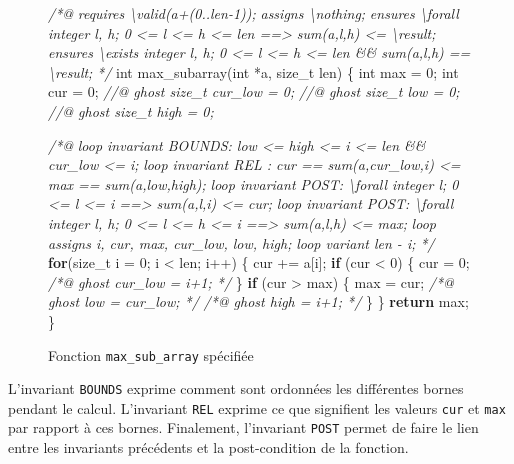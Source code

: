 \documentclass[12pt,francais,]{scrbook}
\newenvironment{Shaded}{}{}
\newcommand{\KeywordTok}[1]{\textcolor[rgb]{0.00,0.44,0.13}{\textbf{{#1}}}}
\newcommand{\DataTypeTok}[1]{\textcolor[rgb]{0.56,0.13,0.00}{{#1}}}
\newcommand{\DecValTok}[1]{\textcolor[rgb]{0.25,0.63,0.44}{{#1}}}
\newcommand{\CommentTok}[1]{\textcolor[rgb]{0.38,0.63,0.69}{\textit{{#1}}}}
\newcommand{\NormalTok}[1]{{#1}}
\begin{document}
\begin{figure}
\begin{footnotesize}\begin{Shaded}
\begin{Highlighting}[]
\CommentTok{/*@ }
\CommentTok{  requires \textbackslash{}valid(a+(0..len-1));}
\CommentTok{  assigns \textbackslash{}nothing;}
\CommentTok{  ensures \textbackslash{}forall integer l, h;  0 <= l <= h <= len ==> sum(a,l,h) <= \textbackslash{}result;}
\CommentTok{  ensures \textbackslash{}exists integer l, h;  0 <= l <= h <= len &&  sum(a,l,h) == \textbackslash{}result;}
\CommentTok{*/}
\DataTypeTok{int} \NormalTok{max_subarray(}\DataTypeTok{int} \NormalTok{*a, size_t len) \{}
  \DataTypeTok{int} \NormalTok{max = }\DecValTok{0}\NormalTok{;}
  \DataTypeTok{int} \NormalTok{cur = }\DecValTok{0}\NormalTok{;}
  \CommentTok{//@ ghost size_t cur_low = 0; }
  \CommentTok{//@ ghost size_t low = 0;}
  \CommentTok{//@ ghost size_t high = 0; }

  \CommentTok{/*@ }
\CommentTok{    loop invariant BOUNDS: low <= high <= i <= len && cur_low <= i;}
\CommentTok{    }
\CommentTok{    loop invariant REL :   cur == sum(a,cur_low,i) <= max == sum(a,low,high);}
\CommentTok{    loop invariant POST:   \textbackslash{}forall integer l;    0 <= l <= i      ==> sum(a,l,i) <= cur;}
\CommentTok{    loop invariant POST:   \textbackslash{}forall integer l, h; 0 <= l <= h <= i ==> sum(a,l,h) <= max;}
\CommentTok{   }
\CommentTok{    loop assigns i, cur, max, cur_low, low, high;}
\CommentTok{    loop variant len - i; }
\CommentTok{  */}
  \KeywordTok{for}\NormalTok{(size_t i = }\DecValTok{0}\NormalTok{; i < len; i++) \{}
    \NormalTok{cur += a[i];}
    \KeywordTok{if} \NormalTok{(cur < }\DecValTok{0}\NormalTok{) \{}
      \NormalTok{cur = }\DecValTok{0}\NormalTok{;}
      \CommentTok{/*@ ghost cur_low = i+1; */}
    \NormalTok{\}}
    \KeywordTok{if} \NormalTok{(cur > max) \{}
      \NormalTok{max = cur;}
      \CommentTok{/*@ ghost low = cur_low; */}
      \CommentTok{/*@ ghost high = i+1; */}
    \NormalTok{\}}
  \NormalTok{\}}
  \KeywordTok{return} \NormalTok{max;}
\NormalTok{\}}
\end{Highlighting}
\end{Shaded}\end{footnotesize}
\caption{Fonction \texttt{max\_sub\_array} spécifiée}
\label{fig:6-2-2-maxsub}
\end{figure}

L'invariant \texttt{BOUNDS} exprime comment sont ordonnées les
différentes bornes pendant le calcul. L'invariant \texttt{REL} exprime
ce que signifient les valeurs \texttt{cur} et \texttt{max} par rapport à
ces bornes. Finalement, l'invariant \texttt{POST} permet de faire le
lien entre les invariants précédents et la post-condition de la
fonction.
\end{document}
